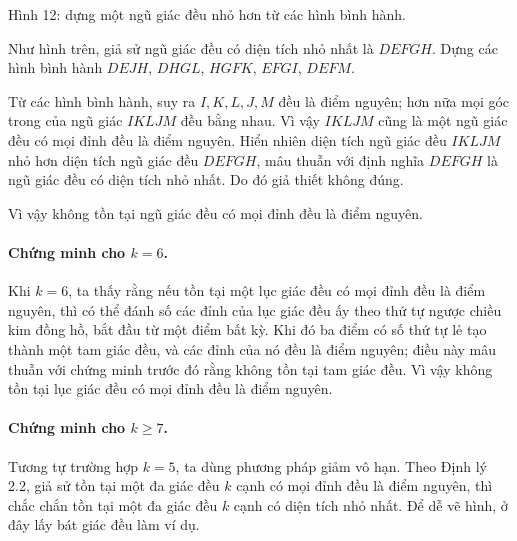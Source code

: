 \documentclass[11pt]{article}
\begin{document}
\begin{center}

\small Hình 12: dựng một ngũ giác đều nhỏ hơn từ các hình bình hành.
\end{center}

Như hình trên, giả sử ngũ giác đều có diện tích nhỏ nhất là \(DEFGH\). Dựng
các hình bình hành \(DEJH\), \(DHGL\), \(HGFK\), \(EFGI\), \(DEFM\).

Từ các hình bình hành, suy ra \(I,K,L,J,M\) đều là điểm nguyên; hơn nữa mọi
góc trong của ngũ giác \(IKLJM\) đều bằng nhau. Vì vậy \(IKLJM\) cũng là một
ngũ giác đều có mọi đỉnh đều là điểm nguyên. Hiển nhiên diện tích ngũ giác đều
\(IKLJM\) nhỏ hơn diện tích ngũ giác đều \(DEFGH\), mâu thuẫn với định nghĩa
\(DEFGH\) là ngũ giác đều có diện tích nhỏ nhất. Do đó giả thiết không đúng.

Vì vậy không tồn tại ngũ giác đều có mọi đỉnh đều là điểm nguyên.

\paragraph{Chứng minh cho \(k=6\).}
Khi \(k=6\), ta thấy rằng nếu tồn tại một lục giác đều có mọi đỉnh đều là điểm
nguyên, thì có thể đánh số các đỉnh của lục giác đều ấy theo thứ tự ngược
chiều kim đồng hồ, bắt đầu từ một điểm bất kỳ. Khi đó ba điểm có số thứ tự lẻ
tạo thành một tam giác đều, và các đỉnh của nó đều là điểm nguyên; điều này
mâu thuẫn với chứng minh trước đó rằng không tồn tại tam giác đều. Vì vậy
không tồn tại lục giác đều có mọi đỉnh đều là điểm nguyên.

\paragraph{Chứng minh cho \(k\ge 7\).}
Tương tự trường hợp \(k=5\), ta dùng phương pháp giảm vô hạn. Theo Định lý
2.2, giả sử tồn tại một đa giác đều \(k\) cạnh có mọi đỉnh đều là điểm nguyên,
thì chắc chắn tồn tại một đa giác đều \(k\) cạnh có diện tích nhỏ nhất. Để dễ
vẽ hình, ở đây lấy bát giác đều làm ví dụ.
\end{document}
